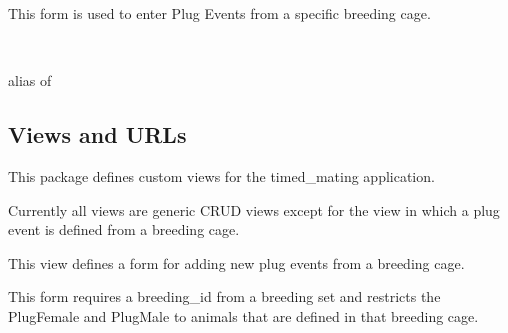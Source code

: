 \documentclass[letterpaper,10pt,english]{sphinxmanual}
\begin{document}
\begin{fulllineitems}
\label{api:timed_mating.forms.BreedingPlugForm}
This form is used to enter Plug Events from a specific breeding cage.

\begin{fulllineitems}
\label{api:timed_mating.forms.BreedingPlugForm.Meta}~

\begin{fulllineitems}
\label{api:timed_mating.forms.BreedingPlugForm.Meta.model}
alias of 

\end{fulllineitems}


\end{fulllineitems}


\begin{fulllineitems}
\label{api:timed_mating.forms.BreedingPlugForm.media}
\end{fulllineitems}


\end{fulllineitems}



\subsection{Views and URLs}
\label{api:id7}\label{api:module-timed_mating.views}
This package defines custom views for the timed\_mating application.

Currently all views are generic CRUD views except for the view in which a plug event is defined from a breeding cage.

\begin{fulllineitems}
\label{api:timed_mating.views.breeding_plugevent}
This view defines a form for adding new plug events from a breeding cage.

This form requires a breeding\_id from a breeding set and restricts the PlugFemale and PlugMale to animals that are defined in that breeding cage.

\end{fulllineitems}
\end{document}
